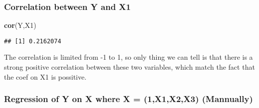 \documentclass[]{article}
\newenvironment{Shaded}{\begin{snugshade}}{\end{snugshade}}
\newcommand{\KeywordTok}[1]{\textcolor[rgb]{0.13,0.29,0.53}{\textbf{#1}}}
\newcommand{\NormalTok}[1]{#1}
\begin{document}
\subsubsection{Correlation between Y and
X1}\label{correlation-between-y-and-x1}

\begin{Shaded}
\begin{Highlighting}[]
\KeywordTok{cor}\NormalTok{(Y,X1)}
\end{Highlighting}
\end{Shaded}

\begin{verbatim}
## [1] 0.2162074
\end{verbatim}

The correlation is limited from -1 to 1, so only thing we can tell is
that there is a strong positive correlation between these two variables,
which match the fact that the coef on X1 is possitive.

\subsubsection{Regression of Y on X where X = (1,X1,X2,X3)
(Mannually)}\label{regression-of-y-on-x-where-x-1x1x2x3-mannually}
\end{document}
